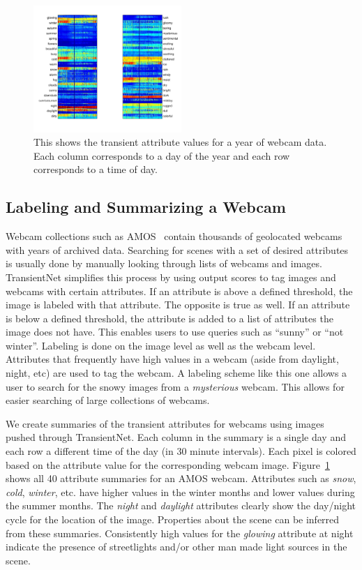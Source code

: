\documentclass[10pt,twocolumn,letterpaper]{article}
\newcommand{\figref}[1]{Figure~\ref{fig:#1}}
\begin{document}
\begin{figure}[t]
	\centering
		\includegraphics[width=0.5\textwidth, trim= 5mm 15mm 0mm 10mm]{figs/summary_260.pdf}
		\caption{This shows the transient attribute values for a year of webcam 
             data.  Each column corresponds to a day of the year and each row
             corresponds to a time of day.}
		\label{fig:webcam_summary}
\end{figure}

\subsection{Labeling and Summarizing a Webcam}

Webcam collections such as AMOS~\cite{jacobs07amos} contain thousands of
geolocated webcams with years of archived data.  Searching for scenes with a
set of desired attributes is usually done by manually looking through lists of
webcams and images.  TransientNet simplifies this process by using output
scores to tag images and webcams with certain attributes.  If an attribute is
above a defined threshold, the image is labeled with that attribute.  The
opposite is true as well.  If an attribute is below a defined threshold, the
attribute is added to a list of attributes the image does not have.  This
enables users to use queries such as ``sunny'' or ``not winter''.  Labeling is
done on the image level as well as the webcam level.  Attributes that
frequently have high values in a webcam (aside from daylight, night, etc) are
used to tag the webcam.  A labeling scheme like this one allows a user to
search for the snowy images from a \textit{mysterious} webcam. This allows for
easier searching of large collections of webcams.

We create summaries of the transient attributes for webcams using images pushed
through TransientNet.  Each column in the summary is a single day and each row
a different time of the day (in 30 minute intervals).  Each pixel is colored
based on the attribute value for the corresponding webcam image.
\figref{webcam_summary} shows all 40 attribute summaries for an AMOS webcam.
Attributes such as \textit{snow}, \textit{cold}, \textit{winter}, etc. have
higher values in the winter months and lower values during the summer months.
The \textit{night} and \textit{daylight} attributes clearly show the day/night
cycle for the location of the image.  Properties about the scene can be
inferred from these summaries.  Consistently high values for the
\textit{glowing} attribute at night indicate the presence of streetlights
and/or other man made light sources in the scene.
\end{document}
